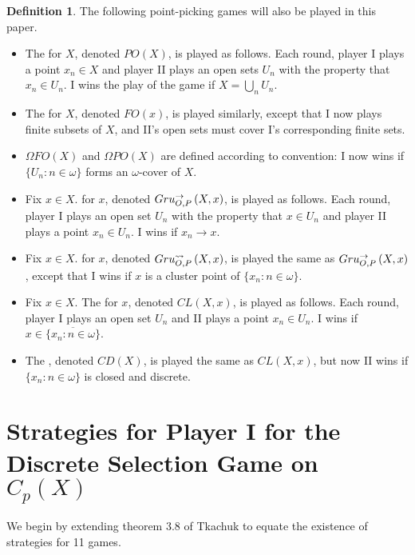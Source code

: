 \documentclass{amsart}
\theoremstyle{plain}
\theoremstyle{definition}
\newtheorem{definition}[theorem]{Definition}
\theoremstyle{remark}
\theoremstyle{plain}
\theoremstyle{definition}
\theoremstyle{remark}
\begin{document}
\begin{definition}
 The following point-picking games will also be played in this paper.
  \begin{itemize}
   \item The  for \(X\), denoted \(PO(X)\), is played as follows. Each round, player I plays a point \(x_n \in X\) and player II plays an open sets \(U_n\) with the property that \(x_n \in U_n\). I wins the play of the game if \(X = \bigcup_n U_n\).
   \item The  for \(X\), denoted \(FO(x)\), is played similarly, except that I now plays finite subsets of \(X\), and II's open sets must cover I's corresponding finite sets.
   \item \(\Omega FO(X)\) and \(\Omega PO(X)\) are defined according to convention: I now wins if \(\{U_n : n \in \omega\}\) forms an \(\omega\)-cover of \(X\).
   \item Fix \(x \in X\).  for \(x\), denoted \(Gru_{O,P}^{\to}\left({X},{x}\right)\), is played as follows. Each round, player I plays an open set \(U_n\) with the property that \(x \in U_n\) and player II plays a point \(x_n \in U_n\). I wins if \(x_n \to x\).
   \item Fix \(x \in X\).  for \(x\), denoted \(Gru_{O,P}^{\leadsto}\left({X},{x}\right)\), is played the same as \(Gru_{O,P}^{\to}\left({X},{x}\right)\), except that I wins if \(x\) is a cluster point of \(\{x_n : n \in \omega\}\).
   \item Fix \(x \in X\). The  for \(x\), denoted \(CL(X,x)\), is played as follows. Each round, player I plays an open set \(U_n\) and II plays a point \(x_n \in U_n\). I wins if \(x \in \overline{\{x_n : n \in \omega\}}\).
   \item The , denoted \(CD(X)\), is played the same as \(CL(X,x)\), but now II wins if \(\{x_n : n \in \omega\}\) is closed and discrete.
 \end{itemize}
\end{definition}

\section{Strategies for Player I for the Discrete Selection Game on \(C_p(X)\)}

We begin by extending theorem 3.8 of Tkachuk\cite{Tkachuk3} to equate the existence of strategies for 11 games.
\end{document}
